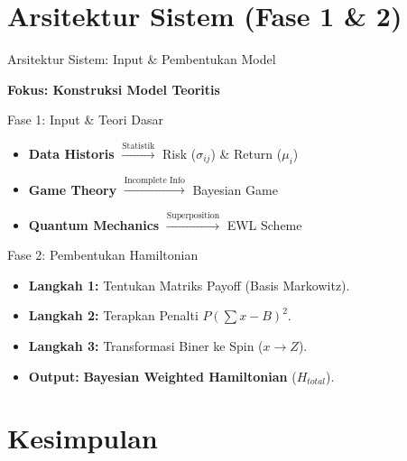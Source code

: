 \documentclass{beamer}
\begin{document}
\section{Arsitektur Sistem (Fase 1 \& 2)}

\begin{frame}{Arsitektur Sistem: Input \& Pembentukan Model}
    \begin{center}
        \textbf{Fokus: Konstruksi Model Teoritis}
    \end{center}
    
    \begin{block}{Fase 1: Input \& Teori Dasar}
        \begin{itemize}
            \item \textbf{Data Historis} $\xrightarrow{\text{Statistik}}$ Risk ($\sigma_{ij}$) \& Return ($\mu_i$)
            \item \textbf{Game Theory} $\xrightarrow{\text{Incomplete Info}}$ Bayesian Game
            \item \textbf{Quantum Mechanics} $\xrightarrow{\text{Superposition}}$ EWL Scheme
        \end{itemize}
    \end{block}
    
    \begin{block}{Fase 2: Pembentukan Hamiltonian}
        \begin{itemize}
            \item \textbf{Langkah 1:} Tentukan Matriks Payoff (Basis Markowitz).
            \item \textbf{Langkah 2:} Terapkan Penalti $P(\sum x - B)^2$.
            \item \textbf{Langkah 3:} Transformasi Biner ke Spin ($x \to Z$).
            \item \textbf{Output:} \textbf{Bayesian Weighted Hamiltonian} ($H_{total}$).
        \end{itemize}
    \end{block}
\end{frame}

\section{Kesimpulan}
\end{document}
